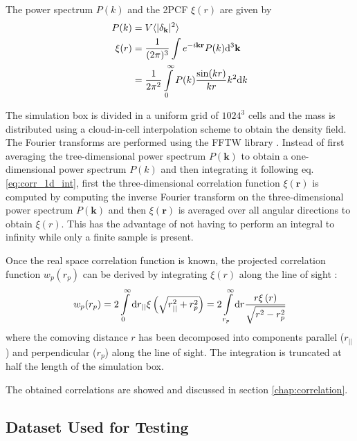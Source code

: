 The power spectrum $P(k)$ and the 2PCF $\xi(r)$ are given by
%
\begin{align}
	P(k)    &= V \langle |\delta_\mathbf{k}|^2 \rangle \\
	\xi(r)  &= \frac{1}{(2\pi)^3} \int e^{-i\mathbf{kr}} P(k) \mathrm{d}^3 \mathbf{k} \\
		    &= \frac{1}{2\pi^2} \int\limits_0^{\infty} P(k) \frac{\sin(kr)}{kr} k^2 \mathrm{d} k \label{eq:corr_1d_int}
\end{align}

The simulation box is divided in a uniform grid of $1024^3$ cells and the mass is distributed using a cloud-in-cell interpolation scheme to obtain the density field.
The Fourier transforms are performed using the FFTW library \parencite{FFTW05}.
Instead of first averaging the tree-dimensional power spectrum $P(\mathbf{k})$ to obtain a one-dimensional power spectrum $P(k)$ and then integrating it following eq. \eqref{eq:corr_1d_int}, first the three-dimensional correlation function $\xi(\mathbf{r})$ is computed by computing the inverse Fourier transform on the three-dimensional power spectrum $P(\mathbf{k})$ and then $\xi(\mathbf{r})$ is averaged over all angular directions to obtain $\xi(r)$.
This has the advantage of not having to perform an integral to infinity while only a finite sample is present.


Once the real space correlation function is known, the projected correlation function $w_p(r_p)$ can be derived by integrating $\xi(r)$ along the line of sight \parencite{Moster2010}:
%
\begin{align}
	w_p(r_p) 
		= 2 \int\limits_{0}^{\infty} \mathrm{d} r_{||} \xi\left( \sqrt{r_{||}^2 + r_{p}^2} \right) 
		= 2 \int\limits_{r_p}^{\infty} \mathrm{d} r \frac{ r \xi\left( r \right) } {\sqrt{r^2 - r_{p}^2}}
\end{align}
%
where the comoving distance $r$ has been decomposed into components parallel ($r_{||}$) and perpendicular ($r_p$) along the line of sight.
The integration is truncated at half the length of the simulation box.



The obtained correlations are showed and discussed in section \ref{chap:correlation}.




\subsection{Dataset Used for Testing}\label{chap:sim_galaxy}

